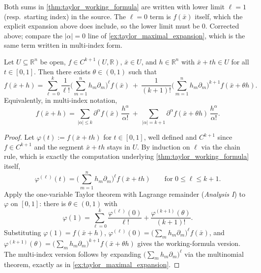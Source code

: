\begin{ainote}
Both sums in \cref{thm:taylor_working_formula} are written with lower limit $\ell = 1$ (resp.\
starting index) in the source. The $\ell = 0$ term is $f(\bar x)$ itself, which the explicit
expansion above does include, so the lower limit must be $0$. Corrected above; compare the
$|\alpha| = 0$ line of \cref{ex:taylor_maximal_expansion}, which is the same term written in
multi-index form.
\end{ainote}

\begin{theorem}
\label{thm:taylor_lagrange_remainder}
Let $U \subseteq \mathbb{R}^n$ be open, $f \in C^{k+1}(U,\mathbb{R})$, $\bar x \in U$, and
$h \in \mathbb{R}^n$ with $\bar x+th \in U$ for all $t \in [0,1]$. Then there exists
$\theta \in (0,1)$ such that
\[f(\bar x+h) = \sum_{\ell=0}^{k}\frac{1}{\ell!}\Big(\sum_{m=1}^n h_m\partial_m\Big)^{\!\ell}
  f(\bar x)
  \ +\ \frac{1}{(k+1)!}\Big(\sum_{m=1}^n h_m\partial_m\Big)^{\!k+1}f(\bar x+\theta h).\]
Equivalently, in multi-index notation,
\[f(\bar x+h) = \sum_{|\alpha|\leq k}\partial^\alpha f(\bar x)\,\frac{h^\alpha}{\alpha!}
  \ +\ \sum_{|\alpha|=k+1}\partial^\alpha f(\bar x+\theta h)\,\frac{h^\alpha}{\alpha!}.\]
\end{theorem}

\begin{proof}
Let $\varphi(t) := f(\bar x+th)$ for $t \in [0,1]$, well defined and $C^{k+1}$ since $f \in
C^{k+1}$ and the segment $\bar x+th$ stays in $U$. By induction on $\ell$ via the chain rule,
which is exactly the computation underlying \cref{thm:taylor_working_formula} itself,
\[\varphi^{(\ell)}(t) = \Big(\sum_{m=1}^n h_m\partial_m\Big)^{\!\ell}f(\bar x+th)
  \qquad \text{for } 0 \leq \ell \leq k+1.\]
Apply the one-variable Taylor theorem with Lagrange remainder (\emph{Analysis I}) to $\varphi$
on $[0,1]$: there is $\theta \in (0,1)$ with
\[\varphi(1) = \sum_{\ell=0}^k\frac{\varphi^{(\ell)}(0)}{\ell!} + \frac{\varphi^{(k+1)}(\theta)}{(k+1)!}.\]
Substituting $\varphi(1) = f(\bar x+h)$, $\varphi^{(\ell)}(0) = \big(\sum_mh_m\partial_m\big)^\ell
f(\bar x)$, and $\varphi^{(k+1)}(\theta) = \big(\sum_mh_m\partial_m\big)^{k+1}f(\bar x+\theta h)$
gives the working-formula version. The multi-index version follows by expanding
$\big(\sum_mh_m\partial_m\big)^\ell$ via the multinomial theorem, exactly as in
\cref{ex:taylor_maximal_expansion}.
\end{proof}

